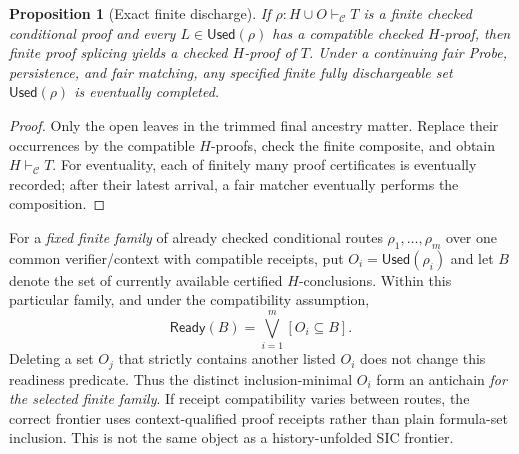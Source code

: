 \documentclass[11pt,letterpaper]{article}
\newtheorem{proposition}[theorem]{Proposition}
\theoremstyle{definition}
\newcommand{\vdC}{\vdash_{\mathcal C}}
\newcommand{\Used}{\mathsf{Used}}
\newcommand{\Ready}{\mathsf{Ready}}
\begin{document}
\begin{proposition}[Exact finite discharge]\label{prop:sets}
If $\rho:H\cup O\vdC T$ is a finite checked conditional proof and
every $L\in\Used(\rho)$ has a compatible checked $H$-proof, then
finite proof splicing yields a checked $H$-proof of $T$.
Under a continuing fair Probe, persistence, and fair matching, any
specified finite \emph{fully dischargeable} set $\Used(\rho)$ is
eventually completed.
\end{proposition}
\begin{proof}
Only the open leaves in the trimmed final ancestry matter. Replace
their occurrences by the compatible $H$-proofs, check the finite
composite, and obtain $H\vdC T$. For eventuality, each of finitely
many proof certificates is eventually recorded; after their latest
arrival, a fair matcher eventually performs the composition.
\end{proof}

For a \emph{fixed finite family} of already checked conditional routes
$\rho_1,\ldots,\rho_m$ over one common verifier/context with compatible
receipts, put $O_i=\Used(\rho_i)$ and let $B$ denote the set of
currently available certified $H$-conclusions. Within this particular
family, and under the compatibility assumption,
\[
 \Ready(B)=\bigvee_{i=1}^m [O_i\subseteq B].
\]
Deleting a set $O_j$ that strictly contains another listed $O_i$
does not change this readiness predicate. Thus the distinct inclusion-minimal
$O_i$ form an antichain \emph{for the selected finite family}. If receipt
compatibility varies between routes, the correct frontier uses
context-qualified proof receipts rather than plain formula-set inclusion.
This is not the same object as a history-unfolded SIC frontier.
\end{document}
